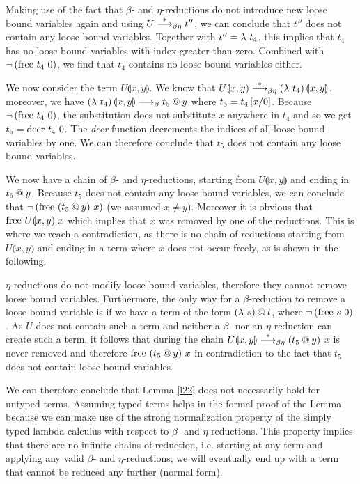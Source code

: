 Making use of the fact that $\beta$- and $\eta$-reductions do not introduce new loose bound variables again and using $U \overset{*}{\longrightarrow}_{\beta\eta} t''$, we can conclude that $t''$ does not contain any loose bound variables. Together with $t'' = \lambda \ t_4$, this implies that $t_4$ has no loose bound variables with index greater than zero. Combined with $\neg \left( \text{free $t_4$ $0$} \right)$, we find that $t_4$ contains no loose bound variables either.

We now consider the term $U \llparenthesis  x, y \rrparenthesis$. We know that $U \llparenthesis  x, y \rrparenthesis \overset{*}{\longrightarrow}_{\beta\eta} \left( \lambda \ t_4 \right) \llparenthesis  x, y \rrparenthesis$, moreover, we have $\left( \lambda \ t_4 \right) \llparenthesis  x, y \rrparenthesis \longrightarrow_\beta t_5 \mathbin{@} y$ where $t_5 = t_4 \left[x / 0 \right]$. Because $\neg \left( \text{free $t_4$ $0$} \right)$, the substitution does not substitute $x$ anywhere in $t_4$ and so we get $t_5 = \text{decr $t_4$ $0$}$. The \textit{decr} function decrements the indices of all loose bound variables by one. We can therefore conclude that $t_5$ does not contain any loose bound variables.

We now have a chain of $\beta$- and $\eta$-reductions, starting from $U \llparenthesis  x, y \rrparenthesis$ and ending in $t_5 \mathbin{@} y$. Because $t_5$ does not contain any loose bound variables, we can conclude that $\neg \left( \text{free $\left( t_5 \mathbin{@} y \right)$ $x$} \right)$ (we assumed $x \neq y$). Moreover it is obvious that $\text{free $U \llparenthesis  x, y \rrparenthesis$ $x$}$ which implies that $x$ was removed by one of the reductions. This is where we reach a contradiction, as there is no chain of reductions starting from $U \llparenthesis  x, y \rrparenthesis$ and ending in a term where $x$ does not occur freely, as is shown in the following.

$\eta$-reductions do not modify loose bound variables, therefore they cannot remove loose bound variables. Furthermore, the only way for a $\beta$-reduction to remove a loose bound variable is if we have a term of the form $\left( \lambda \ s \right) \mathbin{@} t$, where $\neg \left( \text{free $s$ $0$} \right)$. As $U$ does not contain such a term and neither a $\beta$- nor an $\eta$-reduction can create such a term, it follows that during the chain $U \llparenthesis  x, y \rrparenthesis \overset{*}{\longrightarrow}_{\beta\eta} (t_5 \mathbin{@} y)$ $x$ is never removed and therefore $\text{free $ \left( t_5 \mathbin{@} y \right)$ $x$}$ in contradiction to the fact that $t_5$ does not contain loose bound variables.

We can therefore conclude that Lemma \ref{l22} does not necessarily hold for untyped terms. Assuming typed terms helps in the formal proof of the Lemma because we can make use of the strong normalization property of the simply typed lambda calculus with respect to $\beta$- and $\eta$-reductions. This property implies that there are no infinite chains of reduction, i.e. starting at any term and applying any valid $\beta$- and $\eta$-reductions, we will eventually end up with a term that cannot be reduced any further (normal form).

